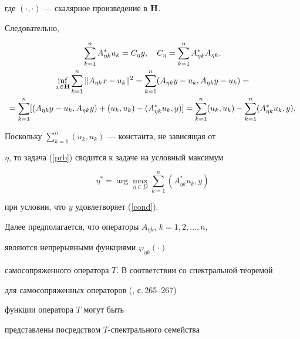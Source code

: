 где $(\cdot,\cdot)$ --- скалярное произведение в ${\bold H}$.


Следовательно,


\begin{gather}


\label{cond}


\sum_{k=1}^nA_{\eta k}^{*}u_k=C_\eta y,\quad C_\eta


=\sum_{k=1}^nA_{\eta k}^{*}A_{\eta k}, \\


%


\inf_{x\in {\bold H }}\sum_{k=1}^n\| A_{\eta k}x-u_k\|^2=


\sum_{k=1}^n( A_{\eta k}y-u_k,A_{\eta k}y-u_k) = \notag \\


%


=\sum_{k=1}^n[ ( A_{\eta k}y-u_k,A_{\eta k}y) +(


u_k,u_k) -( A_{\eta k}^{*}u_k,y)] = 


\sum_{k=1}^n( u_k,u_k) -\sum_{k=1}^n( A_{\eta


k}^{*}u_k,y). \notag


\end{gather}


Поскольку $\sum\limits_{k=1}^n(u_k,u_k)$ --- константа, не зависящая от


$\eta$, то задача (\ref{prb}) сводится к задаче на условный максимум


\begin{equation}


\label{prb1}


\eta^{*}=\arg \max_{\eta \in D}\sum_{k=1}^n( A_{\eta


k}^{*}u_k,y) 


\end{equation}


при условии, что $y$ удовлетворяет (\ref{cond}).





Далее предполагается, что операторы $A_{\eta k}$, $k=1,2,\dotsc,n$,


являются непрерывными функциями $\varphi_{\eta k}(\cdot)$


самосопряженного оператора $T$. В соответствии со спектральной теоремой


для самосопряженных операторов (\cite{Hutson}, с.\,265--267)


функции оператора $T$ могут быть


представлены посредством $T$-спектрального семейства


